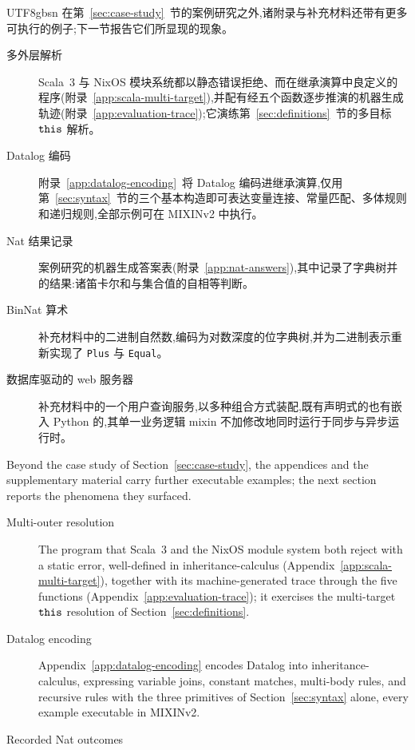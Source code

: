 \begin{CJK*}{UTF8}{gbsn}
\ifPaperChinese
在第~\ref{sec:case-study}~节的案例研究之外,诸附录与补充材料还带有更多可执行的例子;下一节报告它们所显现的现象。
\begin{description}
  \item[多外层解析]
    Scala~3 与 NixOS 模块系统都以静态错误拒绝、而在继承演算中良定义的程序(附录~\ref{app:scala-multi-target}),并配有经五个函数逐步推演的机器生成轨迹(附录~\ref{app:evaluation-trace});它演练第~\ref{sec:definitions}~节的多目标 $\mathtt{this}$ 解析。
  \item[Datalog 编码]
    附录~\ref{app:datalog-encoding}~将 Datalog 编码进继承演算,仅用第~\ref{sec:syntax}~节的三个基本构造即可表达变量连接、常量匹配、多体规则和递归规则,全部示例可在 MIXINv2 中执行。
  \item[Nat 结果记录]
    案例研究的机器生成答案表(附录~\ref{app:nat-answers}),其中记录了字典树并的结果:诸笛卡尔和与集合值的自相等判断。
  \item[BinNat 算术]
    补充材料中的二进制自然数,编码为对数深度的位字典树,并为二进制表示重新实现了 \texttt{Plus} 与 \texttt{Equal}。
  \item[数据库驱动的 web 服务器]
    补充材料中的一个用户查询服务,以多种组合方式装配,既有声明式的也有嵌入 Python 的,其单一业务逻辑 mixin 不加修改地同时运行于同步与异步运行时。
\end{description}
\else
Beyond the case study of Section~\ref{sec:case-study}, the appendices and
the supplementary material carry further executable examples; the next
section reports the phenomena they surfaced.
\begin{description}
  \item[Multi-outer resolution]
    The program that Scala~3 and the NixOS module system both reject with a
    static error, well-defined in inheritance-calculus
    (Appendix~\ref{app:scala-multi-target}), together with its
    machine-generated trace through the five functions
    (Appendix~\ref{app:evaluation-trace}); it exercises the multi-target
    $\mathtt{this}$ resolution of Section~\ref{sec:definitions}.
  \item[Datalog encoding]
    Appendix~\ref{app:datalog-encoding} encodes Datalog into
    inheritance-calculus, expressing variable joins,
    constant matches, multi-body rules, and recursive rules with
    the three primitives of Section~\ref{sec:syntax} alone, every example
    executable in MIXINv2.
  \item[Recorded Nat outcomes]

\end{description}
\end{CJK*}
